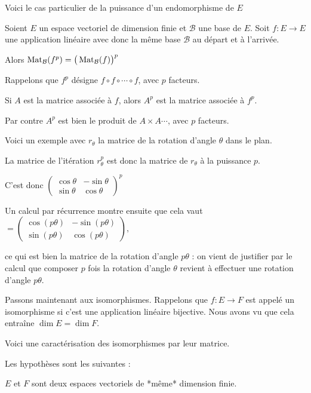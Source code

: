 \diapo

Voici le cas particulier de la puissance d'un endomorphisme de $E$

Soient $E$ un espace vectoriel de dimension finie et $\mathcal{B}$ une base de $E$.
Soit $f :  E \to E$ une application linéaire avec donc la même base
$\mathcal{B}$ au départ et à l'arrivée.


Alors
$\mathop{\mathrm{Mat}}\nolimits_{\mathcal{B}} (f^p) = \big( \mathop{\mathrm{Mat}}\nolimits_{\mathcal{B}} (f) \big)^p$

\change
Rappelons que $f^p$ désigne $f \circ f \circ\cdots \circ f$,
avec $p$ facteurs.

Si $A$ est la matrice associée à $f$,
alors $A^p$ est la matrice associée à $f^p$.

Par contre $A^p$ est bien le produit de $A\times A \cdots$,
avec $p$ facteurs.

\change
Voici un exemple avec  $r_\theta$ la matrice de la rotation d'angle $\theta$ dans le plan.


\change
La matrice de l'itération $r_\theta^p$  est donc
la matrice de $r_\theta$ à la puissance $p$.

\change
C'est donc $\begin{pmatrix}
\cos\theta & -\sin\theta\\
\sin\theta & \cos\theta
\end{pmatrix}^p$


\change
Un calcul par récurrence montre ensuite 
que cela vaut $= \begin{pmatrix}
\cos(p\theta) & -\sin(p\theta)\\
\sin(p\theta) & \cos(p\theta)
\end{pmatrix},$

ce qui est bien la matrice de la rotation d'angle $p \theta$ :  on vient de justifier par le calcul que 
composer $p$ fois la rotation d'angle $\theta$ revient à 
effectuer une rotation d'angle $p\theta$.


\diapo

Passons maintenant aux isomorphismes. 
Rappelons que $f : E \to F$ est appelé un isomorphisme 
si c'est une application linéaire bijective. Nous avons vu que cela entraîne 
$\dim E = \dim F$.

\change
Voici une caractérisation  des isomorphismes par leur matrice.


Les hypothèses sont les suivantes :

$E$ et $F$ sont deux espaces vectoriels de *même* dimension finie.

